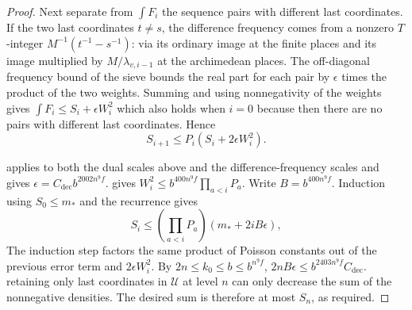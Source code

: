 \begin{proof}
Next separate from $\int F_i$ the sequence pairs with different last coordinates.
If the two last coordinates $t\ne s$, the difference frequency comes from a nonzero $T$-integer
$M^{-1}(t^{-1}-s^{-1})$:
via its ordinary image at the finite places and its image multiplied by $M/\lambda_{v,i-1}$ at the archimedean places.
The off-diagonal frequency bound of the sieve bounds the real part for each pair by $\epsilon$ times the product of the two weights.
Summing and using nonnegativity of the weights gives $\int F_i\le S_i+\epsilon W_i^2$
which also holds when $i=0$ because then there are no pairs with different last coordinates. Hence
\[
 S_{i+1}\le P_i(S_i+2\epsilon W_i^2).
\]

 applies to both the dual scales above and the difference-frequency scales
and gives $\epsilon=C_{\mathrm{dec}}b^{2002n^9f}$.
 gives
$W_i^2\le b^{400n^9f}\prod_{a<i}P_a$.
Write $B=b^{400n^9 f}$. Induction using $S_0\le m_*$ and the recurrence gives
\[
 S_i\le\left(\prod_{a<i}P_a\right)(m_*+2iB\epsilon),
\]
The induction step factors the same product of Poisson constants out of the previous error term and $2\epsilon W_i^2$.
By $2n\le k_0\le b\le b^{n^9f}$,
$2nB\epsilon\le b^{2403n^9f}C_{\mathrm{dec}}$.
retaining only last coordinates in $\mathcal U$ at level $n$ can only decrease the sum of the nonnegative densities.
The desired sum is therefore at most $S_n$, as required.
\end{proof}

